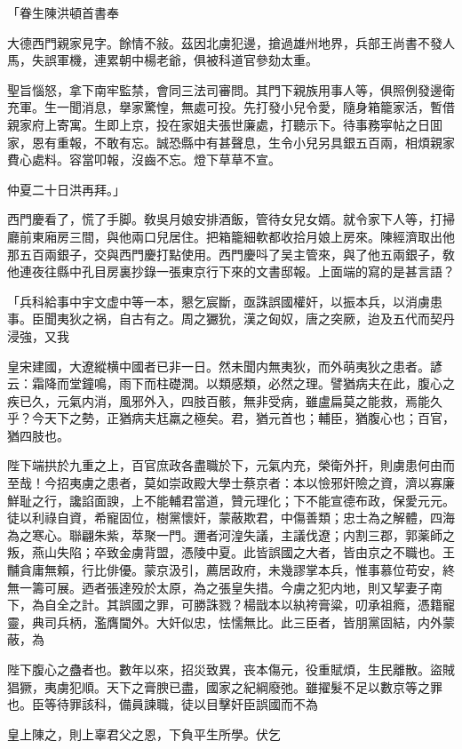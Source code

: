 「眷生陳洪頓首書奉

大德西門親家見字。餘情不敍。茲因北虜犯邊，搶過雄州地界，兵部王尚書不發人馬，失誤軍機，連累朝中楊老爺，俱被科道官參劾太重。

聖旨惱怒，拿下南牢監禁，會同三法司審問。其門下親族用事人等，俱照例發邊衛充軍。生一聞消息，擧家驚惶，無處可投。先打發小兒令愛，隨身箱籠家活，暫借親家府上寄寓。生即上京，投在家姐夫張世廉處，打聽示下。待事務寜帖之日囬家，恩有重報，不敢有忘。誠恐縣中有甚聲息，生令小兒另具銀五百兩，相煩親家費心處料。容當叩報，沒齒不忘。燈下草草不宣。

仲夏二十日洪再拜。」

西門慶看了，慌了手脚。敎吳月娘安排酒飯，管待女兒女婿。就令家下人等，打掃廳前東廂房三間，與他兩口兒居住。把箱籠細軟都收拾月娘上房來。陳經濟取出他那五百兩銀子，交與西門慶打點使用。西門慶呌了吴主管來，與了他五兩銀子，敎他連夜往縣中孔目房裏抄錄一張東京行下來的文書邸報。上面端的寫的是甚言語？

「兵科給事中宇文虚中等一本，懇乞宸斷，亟誅誤國權奸，以振本兵，以消虜患事。臣聞夷狄之祸，自古有之。周之玁狁，漢之匈奴，唐之突厥，迨及五代而契丹浸強，又我

皇宋建國，大遼縱横中國者已非一日。然未聞内無夷狄，而外萌夷狄之患者。諺云：霜降而堂鐘鳴，雨下而柱礎潤。以類感類，必然之理。譬猶病夫在此，腹心之疾已久，元氣内消，風邪外入，四肢百骸，無非受病，雖盧扁莫之能救，焉能久乎？今天下之勢，正猶病夫尪羸之極矣。君，猶元首也；輔臣，猶腹心也；百官，猶四肢也。

陛下端拱於九重之上，百官庶政各盡職於下，元氣内充，榮衛外扞，則虜患何由而至哉！今招夷虜之患者，莫如崇政殿大學士蔡京者：本以憸邪奸險之資，濟以寡廉鮮耻之行，讒諂面諛，上不能輔君當道，贊元理化；下不能宣德布政，保愛元元。徒以利祿自資，希寵固位，樹黨懷奸，蒙蔽欺君，中傷善類；忠士為之解體，四海為之寒心。聯翩朱紫，萃聚一門。邇者河湟失議，主議伐遼；内割三郡，郭薬師之叛，燕山失陷；卒致金虜背盟，憑陵中夏。此皆誤國之大者，皆由京之不職也。王黼貪庸無賴，行比俳優。蒙京汲引，薦居政府，未幾謬掌本兵，惟事慕位苟安，終無一籌可展。迺者張達殁於太原，為之張皇失措。今虜之犯内地，則又挈妻子南下，為自全之計。其誤國之罪，可勝誅戮？楊戩本以紈袴膏粱，叨承祖癊，憑籍寵靈，典司兵柄，濫膺閫外。大奸似忠，怯懦無比。此三臣者，皆朋黨固結，内外蒙蔽，為

陛下腹心之蠱者也。數年以來，招災致異，丧本傷元，役重賦煩，生民離散。盜賊猖獗，夷虜犯順。天下之膏腴已盡，國家之紀綱廢弛。雖擢髮不足以數京等之罪也。臣等待罪該科，備員諫職，徒以目擊奸臣誤國而不為

皇上陳之，則上辜君父之恩，下負平生所學。伏乞


